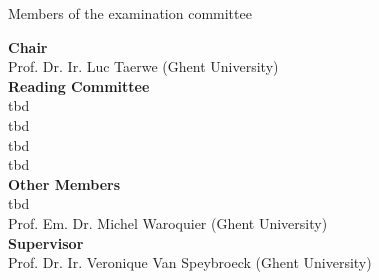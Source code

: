 \cleardoublepage
\thispagestyle{empty}

\vspace*{\fill}
\Large
Members of the examination committee

\vspace{0.5cm}
\normalsize
\textbf{Chair} \\

Prof. Dr. Ir. Luc Taerwe (Ghent University)\\

\textbf{Reading Committee} \\  

 tbd \\
\indent tbd \\
\indent tbd \\
\indent tbd \\

\textbf{Other Members} \\ 

\indent tbd \\
\indent Prof. Em. Dr. Michel Waroquier (Ghent University)\\

\textbf{Supervisor} \\

\indent Prof. Dr. Ir. Veronique Van Speybroeck (Ghent University)\\

\vspace*{\fill}
